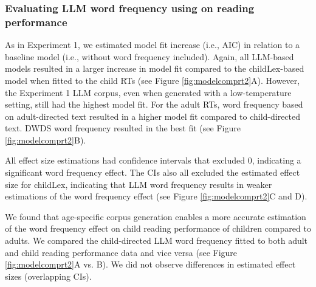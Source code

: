 \documentclass[manuscript]{stjour}
\begin{document}

\subsubsection*{Evaluating LLM word frequency using on reading performance}

As in Experiment 1, we estimated model fit increase (i.e.,  AIC) in relation to a baseline model (i.e., without word frequency included). Again, all LLM-based models resulted in a larger increase in model fit compared to the childLex-based model when fitted to the child RTs (see Figure \ref{fig:modelcomprt2}A). However, the Experiment 1 LLM corpus, even when generated with a low-temperature setting, still had the highest model fit. For the adult RTs, word frequency based on adult-directed text resulted in a higher model fit compared to child-directed text. DWDS word frequency resulted in the best fit (see Figure \ref{fig:modelcomprt2}B). 

All effect size estimations had confidence intervals that excluded 0, indicating a significant word frequency effect. The CIs also all excluded the estimated effect size for childLex, indicating that LLM word frequency results in weaker estimations of the word frequency effect (see Figure \ref{fig:modelcomprt2}C and D).

We found that age-specific corpus generation enables a more accurate estimation of the word frequency effect on child reading performance of children compared to adults. We compared the child-directed LLM word frequency fitted to both adult and child reading performance data and vice versa (see Figure \ref{fig:modelcomprt2}A vs. B). We did not observe differences in estimated effect sizes (overlapping CIs).  
\end{document}
